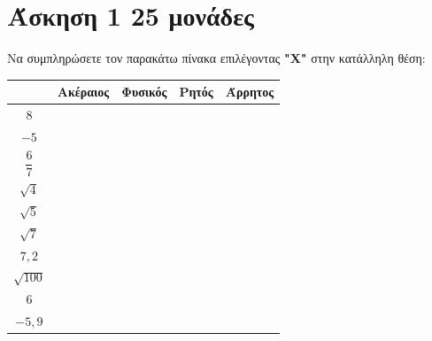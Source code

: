 \documentclass[a4paper,10pt]{report}
\begin{document}
\section*{Άσκηση 1  \hfill \small{25 μονάδες}}
Να συμπληρώσετε τον παρακάτω πίνακα επιλέγοντας \textbf{"X"} στην κατάλληλη θέση:
\begin{center}
 \begin{tabular}{|c|c|c|c|c|}
\hline                   
       & \textbf{Ακέραιος} &  \textbf{Φυσικός} & \textbf{Ρητός}&  \textbf{Άρρητος}   \\
\hline 
  $8$            &                        &                      &                      &           \\
\hline 
  $-5$            &                        &                       &                     &           \\
\hline 
  $\dfrac{6}{7}$             &                       &                       &                     &           \\
\hline 
  $\sqrt{4}$             &                       &                       &                     &           \\
\hline
  $\sqrt{5}$             &                       &                       &                        &           \\
\hline
  $\sqrt{7}$             &                       &                       &                        &           \\
\hline
  $7,2$             &                       &                       &                        &           \\
\hline
  $\sqrt{100}$             &                       &                      &                       &           \\
\hline
  $6$             &                       &                       &                        &        \\
\hline 
$-5,9$            &                       &                      &                         &   \\
\hline
\end{tabular}
\end{center}
\end{document}
